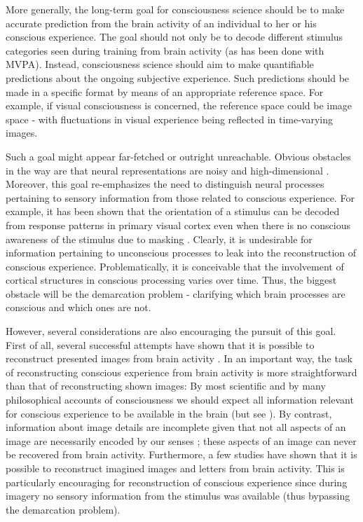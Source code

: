 More generally, the long-term goal for consciousness science should be to make accurate prediction from the brain activity of an individual to her or his conscious experience. The goal should not only be to decode different stimulus categories seen during training from brain activity (as has been done with MVPA). Instead, consciousness science should aim to make quantifiable predictions about the ongoing subjective experience. Such predictions should be made in a specific format by means of an appropriate reference space. For example, if visual consciousness is concerned, the reference space could be image space - with fluctuations in visual experience being reflected in time-varying images.

Such a goal might appear far-fetched or outright unreachable. Obvious obstacles in the way are that neural representations are noisy and high-dimensional \parencite{StYves2019}. Moreover, this goal re-emphasizes the need to distinguish neural processes pertaining to sensory information from those related to conscious experience. For example, it has been shown that the orientation of a stimulus can be decoded from response patterns in primary visual cortex even when there is no conscious awareness of the stimulus due to masking \parencite{Haynes2005}. Clearly, it is undesirable for information pertaining to unconscious processes to leak into the reconstruction of conscious experience. Problematically, it is conceivable that the involvement of cortical structures in conscious processing varies over time. Thus, the biggest obstacle will be the demarcation problem - clarifying which brain processes are conscious and which ones are not.

However, several considerations are also encouraging the pursuit of this goal. First of all, several successful attempts have shown that it is possible to reconstruct presented images from brain activity \parencite{Thirion2006, Miyawaki2008, Naselaris2009, Nishimoto2011, Schoenmakers2013, Senden2018, VanGerven2018, StYves2019}. In an important way, the task of reconstructing conscious experience from brain activity is more straightforward than that of reconstructing shown images: By most scientific and by many philosophical accounts of consciousness we should expect all information relevant for conscious experience to be available in the brain (but see \cite{ORegan2001}). By contrast, information about image details are incomplete given that not all aspects of an image are necessarily encoded by our senses \parencite{StYves2019}; these aspects of an image can never be recovered from brain activity. Furthermore, a few studies have shown that it is possible to reconstruct imagined images \parencite{Naselaris2015b} and letters \parencite{Senden2018} from brain activity. This is particularly encouraging for reconstruction of conscious experience since during imagery no sensory information from the stimulus was available (thus bypassing the demarcation problem).

